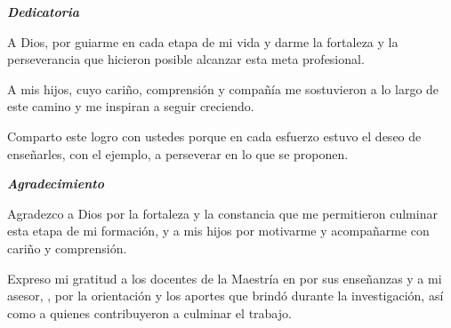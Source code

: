 \clearpage
\thispagestyle{plain}
\vspace*{\fill}
\noindent\hfill
\begin{minipage}{.88\linewidth}
  \raggedleft\itshape
  \textbf{Dedicatoria}\par
  \medskip

  A Dios, por guiarme en cada etapa de mi vida y darme la fortaleza y la
  perseverancia que hicieron posible alcanzar esta meta profesional.

  A mis hijos, cuyo cariño, comprensión y compañía me sostuvieron a lo
  largo de este camino y me inspiran a seguir creciendo.

  Comparto este logro con ustedes porque en cada esfuerzo estuvo el deseo
  de enseñarles, con el ejemplo, a perseverar en lo que se proponen.
\end{minipage}
\par\vspace*{.16\textheight}

\clearpage
\thispagestyle{plain}
\noindent\hfill
\begin{minipage}{.88\linewidth}
  \raggedleft\itshape
  \textbf{Agradecimiento}\par
  \vspace{.08\textheight}

  Agradezco a Dios por la fortaleza y la constancia que me permitieron
  culminar esta etapa de mi formación, y a mis hijos por motivarme y
  acompañarme con cariño y comprensión.

  Expreso mi gratitud a los docentes de la Maestría en \programaTesis{}
  por sus enseñanzas y a mi asesor, \asesorTesis, por la orientación y
  los aportes que brindó durante la investigación, así como a quienes
  contribuyeron a culminar el trabajo.
\end{minipage}
\par\vspace{.05\textheight}
\begin{center}
  \autorTesis
\end{center}
